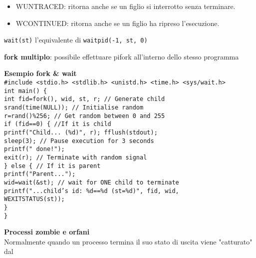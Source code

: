 \begin{flushleft}
\begin{flushleft}
\begin{flushleft}
\begin{itemize}
        \item WUNTRACED: ritorna anche se un figlio si \ace interrotto senza terminare.
        \item WCONTINUED: ritorna anche se un figlio ha ripreso l'esecuzione.
      \end{itemize}
      \texttt{wait(st)} \ace l'equivalente di \texttt{waitpid(-1, st, 0)} 
    \end{flushleft}
    \begin{flushleft}
      \textbf{fork multiplo}: \ace possibile effettuare pi\acu fork all'interno dello stesso programma
    \end{flushleft}
    \begin{flushleft}
      \textbf{Esempio fork \& wait} \\
      \texttt{\#include <stdio.h> <stdlib.h> <unistd.h> <time.h> <sys/wait.h>\\
              int main() \{\\
              \halftab int fid=fork(), wid, st, r; // Generate child\\
              \halftab srand(time(NULL)); // Initialise random\\
              \halftab r=rand()\%256; // Get random between 0 and 255\\
              \halftab if (fid==0) \{ //If it is child\\
              \tab printf("Child... (\%d)", r); fflush(stdout);\\
              \tab sleep(3); // Pause execution for 3 seconds\\
              \tab printf(" done!\n");\\
              \tab exit(r); // Terminate with random signal\\
              \halftab \} else \{ // If it is parent\\
              \tab printf("Parent...\n");\\
              \tab wid=wait(\&st); // wait for ONE child to terminate\\
              \tab printf("...child's id: \%d==\%d (st=\%d)\n", fid, wid, \\ \tab \tab WEXITSTATUS(st));\\
              \halftab \} \\  \}}
    \end{flushleft}
    \begin{flushleft}
      \textbf{Processi zombie e orfani} \\
      Normalmente quando un processo termina il suo stato di uscita viene "catturato" dal 

\end{flushleft}
\end{flushleft}
\end{flushleft}
